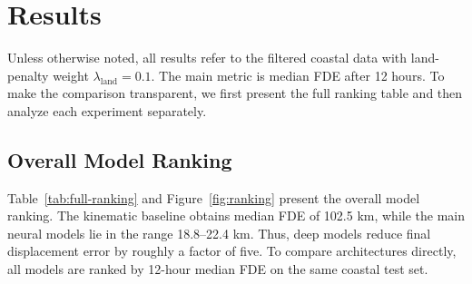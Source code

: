 \section{Results}
Unless otherwise noted, all results refer to the filtered coastal data with land-penalty weight $\lambda_{\mathrm{land}}=0.1$. The main metric is median FDE after 12 hours. To make the comparison transparent, we first present the full ranking table and then analyze each experiment separately.

\begin{table}[!htbp]
\centering
\footnotesize
\caption{Full coastal test-set ranking. The primary metric is median FDE at the 12-hour horizon; ADE is reported when available.}
\label{tab:full-ranking}
\end{table}

\subsection{Overall Model Ranking}
Table~\ref{tab:full-ranking} and Figure~\ref{fig:ranking} present the overall model ranking. The kinematic baseline obtains median FDE of 102.5 km, while the main neural models lie in the range 18.8--22.4 km. Thus, deep models reduce final displacement error by roughly a factor of five. To compare architectures directly, all models are ranked by 12-hour median FDE on the same coastal test set.

